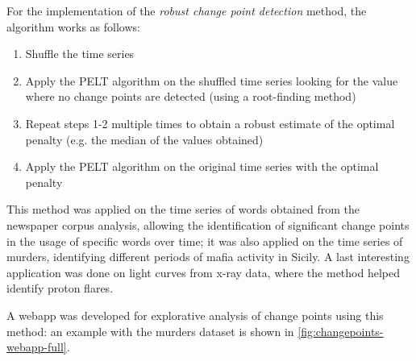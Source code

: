 For the implementation of the \textit{robust change point detection} method, the algorithm works as follows:
\begin{enumerate}
  \item Shuffle the time series
  \item Apply the PELT algorithm on the shuffled time series looking for the value where no change points are detected (using a root-finding method)
  \item Repeat steps 1-2 multiple times to obtain a robust estimate of the optimal penalty (e.g. the median of the values obtained)
  \item Apply the PELT algorithm on the original time series with the optimal penalty
\end{enumerate}

This method was applied on the time series of words obtained from the newspaper corpus analysis, allowing the identification of significant change points in the usage of specific words over time; it was also applied on the time series of murders, identifying different periods of mafia activity in Sicily. A last interesting application was done on light curves from x-ray data, where the method helped identify proton flares.

A webapp was developed for explorative analysis of change points using this method: an example with the murders dataset is shown in \autoref{fig:changepoints-webapp-full}.

